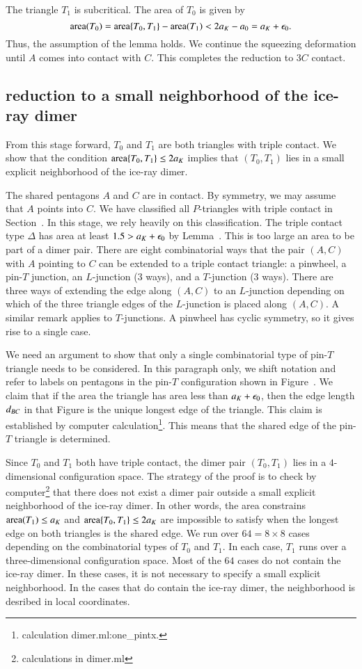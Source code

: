 The triangle $T_1$ is subcritical.  The area of $T_0$ is given by
\[
{\operatorname{area}}(T_0) = {\operatorname{area}}\{T_0,T_1\} - {\operatorname{area}}(T_1) < 2a_K - a_0 = a_K+\epsilon_0.
\]
Thus, the assumption of the lemma holds.
We continue the squeezing deformation until $A$ comes into contact with $C$.
This completes the reduction to $3C$ contact.


\subsection{reduction to a small neighborhood of the ice-ray dimer}\label{sec:nbd}

From this stage forward, $T_0$ and $T_1$ are both triangles with triple contact.
We show that the condition ${\operatorname{area}}\{T_0,T_1\}\le 2a_K$ implies that
$(T_0,T_1)$ lies in a small explicit neighborhood of the ice-ray dimer.

The shared pentagons $A$ and $C$ are in contact.  By symmetry, we may assume that $A$ points into $C$.
We have classified all $P$-triangles with triple contact in Section~.  In this stage, we rely heavily
on this classification.   The triple contact type $\Delta$ has area at least $1.5 > a_K+\epsilon_0$ by Lemma~.
This is too large an area to be part of a dimer pair.   There are eight combinatorial ways that the pair $(A,C)$ with $A$ pointing
to $C$ can be extended to a  triple contact triangle: a pinwheel, a pin-$T$ junction, an $L$-junction (3 ways), and a $T$-junction (3 ways).
There are three ways of extending the edge along $(A,C)$ to an $L$-junction depending on which of the three triangle edges of the $L$-junction
is placed along $(A,C)$.  A similar remark applies to $T$-junctions.  A pinwheel has cyclic symmetry, so it gives rise to a single case.

We need an argument to show that only a single combinatorial type of pin-$T$ triangle needs to be considered.  
In this paragraph only, we shift notation and refer
to labels on pentagons in the pin-$T$ configuration shown in Figure~.  We claim that if the area the triangle has area less than
$a_K+\epsilon_0$, then the edge length $d_{BC}$ in that Figure is the unique longest edge of the triangle.   
This claim is established by computer calculation\footnote{calculation dimer.ml:one\_pintx.}.  
This means that the shared edge of the pin-$T$ triangle is determined.

Since $T_0$ and $T_1$ both have triple contact, the dimer pair $(T_0,T_1)$ lies in a $4$-dimensional configuration space.
The strategy of the proof is to check by computer\footnote{calculations in dimer.ml} 
that there does not exist a  dimer pair outside a small explicit neighborhood
of the ice-ray dimer.  In other words, the area constrains ${\operatorname{area}}(T_1)\le a_K$ and ${\operatorname{area}}\{T_0,T_1\}\le2a_K$ are
impossible to satisfy when the longest edge on both triangles is the shared edge.  
We run over $64 = 8\times 8$ cases depending on the combinatorial types of $T_0$ and $T_1$.  In each case,
$T_1$ runs over a three-dimensional configuration space.  Most of the $64$ cases do not contain the ice-ray dimer.
In these cases, it is not necessary to specify a small explicit neighborhood.  In the cases that do contain the ice-ray dimer,
the neighborhood is desribed in local coordinates.

